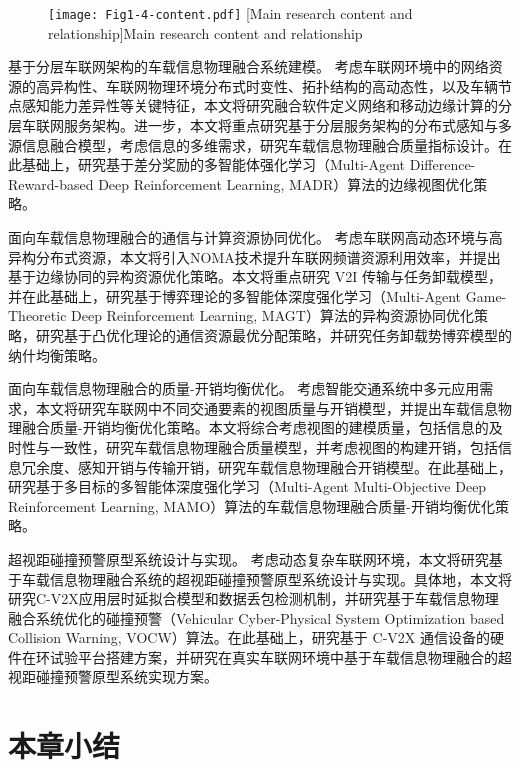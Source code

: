 \begin{figure}[h] 
	\centering
	\texttt{[image: Fig1-4-content.pdf]}
	[Main research content and relationship]{Main research content and relationship}
	\label{fig 1-4}
\end{figure}

 基于分层车联网架构的车载信息物理融合系统建模。
考虑车联网环境中的网络资源的高异构性、车联网物理环境分布式时变性、拓扑结构的高动态性，以及车辆节点感知能力差异性等关键特征，本文将研究融合软件定义网络和移动边缘计算的分层车联网服务架构。进一步，本文将重点研究基于分层服务架构的分布式感知与多源信息融合模型，考虑信息的多维需求，研究车载信息物理融合质量指标设计。在此基础上，研究基于差分奖励的多智能体强化学习（Multi-Agent Difference-Reward-based Deep Reinforcement Learning, MADR）算法的边缘视图优化策略。

 面向车载信息物理融合的通信与计算资源协同优化。
考虑车联网高动态环境与高异构分布式资源，本文将引入NOMA技术提升车联网频谱资源利用效率，并提出基于边缘协同的异构资源优化策略。本文将重点研究 V2I 传输与任务卸载模型，并在此基础上，研究基于博弈理论的多智能体深度强化学习（Multi-Agent Game-Theoretic Deep Reinforcement Learning, MAGT）算法的异构资源协同优化策略，研究基于凸优化理论的通信资源最优分配策略，并研究任务卸载势博弈模型的纳什均衡策略。

 面向车载信息物理融合的质量-开销均衡优化。
考虑智能交通系统中多元应用需求，本文将研究车联网中不同交通要素的视图质量与开销模型，并提出车载信息物理融合质量-开销均衡优化策略。本文将综合考虑视图的建模质量，包括信息的及时性与一致性，研究车载信息物理融合质量模型，并考虑视图的构建开销，包括信息冗余度、感知开销与传输开销，研究车载信息物理融合开销模型。在此基础上，研究基于多目标的多智能体深度强化学习（Multi-Agent Multi-Objective Deep Reinforcement Learning, MAMO）算法的车载信息物理融合质量-开销均衡优化策略。

 超视距碰撞预警原型系统设计与实现。
考虑动态复杂车联网环境，本文将研究基于车载信息物理融合系统的超视距碰撞预警原型系统设计与实现。具体地，本文将研究C-V2X应用层时延拟合模型和数据丢包检测机制，并研究基于车载信息物理融合系统优化的碰撞预警（Vehicular Cyber-Physical System Optimization based Collision Warning, VOCW）算法。在此基础上，研究基于 C-V2X 通信设备的硬件在环试验平台搭建方案，并研究在真实车联网环境中基于车载信息物理融合的超视距碰撞预警原型系统实现方案。

\section[\hspace{-2pt}本章小结]{{ \hspace{-8pt}本章小结}}\label{section 1-5}

